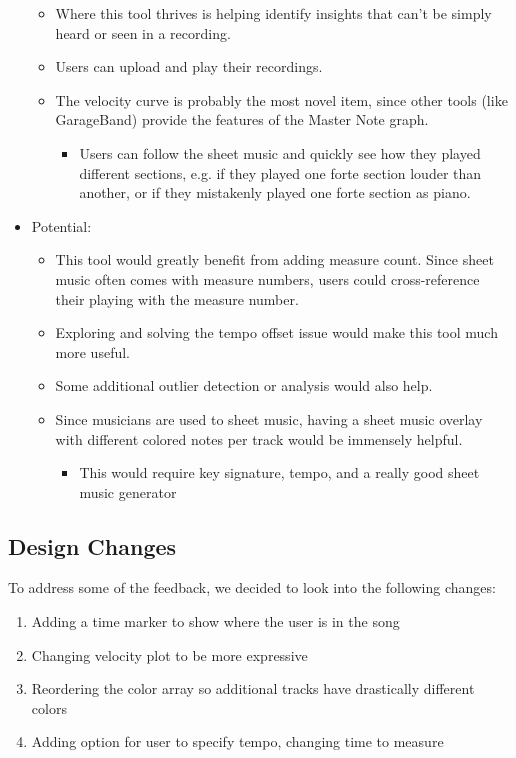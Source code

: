 \documentclass[journal]{vgtc}                %
\begin{document}
\begin{itemize}
\begin{itemize}
    \item Where this tool thrives is helping identify insights that can’t be
    simply heard or seen in a recording.
    \item Users can upload and play their recordings.
    \item The velocity curve is probably the most novel item, since other tools
    (like GarageBand) provide the features of the Master Note graph.
    \begin{itemize}
      \item Users can follow the sheet music and quickly see how they played
      different sections, e.g. if they played one forte section louder than
      another, or if they mistakenly played one forte section as piano.
    \end{itemize}
  \end{itemize}
  \item Potential:
  \begin{itemize}
    \item This tool would greatly benefit from adding measure count. Since sheet
    music often comes with measure numbers, users could cross-reference their
    playing with the measure number.
    \item Exploring and solving the tempo offset issue would make this tool much
    more useful.
    \item Some additional outlier detection or analysis would also help.
    \item Since musicians are used to sheet music, having a sheet music overlay
    with different colored notes per track would be immensely helpful.
    \begin{itemize}
      \item This would require key signature, tempo, and a really good sheet music generator
    \end{itemize}
  \end{itemize}
\end{itemize}

\subsection{Design Changes}

To address some of the feedback, we decided to look into the
following changes:

\begin{enumerate}
  \item Adding a time marker to show where the user is in the song
  \item Changing velocity plot to be more expressive
  \item Reordering the color array so additional tracks have drastically different colors
  \item Adding option for user to specify tempo, changing time to measure
\end{enumerate}
\end{document}
